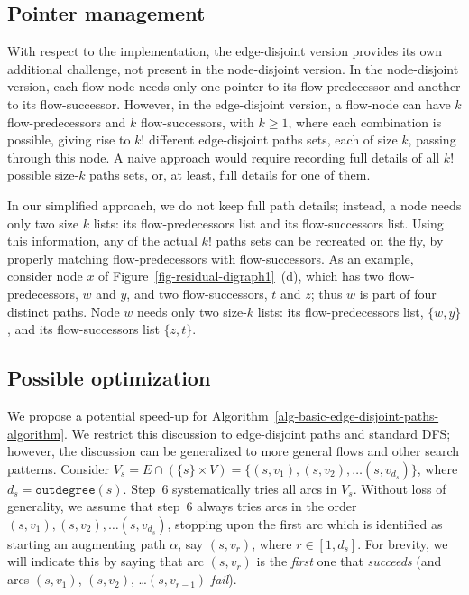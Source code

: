 \documentclass[preliminary,copyright,creativecommons]{eptcs}
\theoremstyle{remark}
\begin{document}
\subsection{Pointer management}
\label{sec-pointer-management}

With respect to the implementation, the edge-disjoint version provides 
its own additional challenge, not present in the node-disjoint version. 
In the node-disjoint version,
each flow-node needs only one pointer to its flow-predecessor and another 
to its flow-successor. However, in the edge-disjoint version,
a flow-node can have $k$ flow-predecessors and $k$ flow-successors, with $k \geq 1$,
where each combination is possible, giving rise to $k!$ 
different edge-disjoint paths sets, each of size $k$, passing through this node.
A naive approach would require recording full details of all $k!$ possible 
size-$k$ paths sets,
or, at least, full details for one of them.

In our simplified approach, we do not keep full path details;
instead, a node needs only two size $k$ lists:
its flow-predecessors list and its flow-successors list.
Using this information, any of the actual $k!$ paths sets can be recreated on the fly,
by properly matching flow-predecessors with flow-successors.
As an example, consider node $x$ of Figure~\ref{fig-residual-digraph1}~(d),
which has two flow-predecessors, $w$ and $y$, and two flow-successors, $t$ and $z$;
thus $w$ is part of four distinct paths.
Node $w$ needs only two size-$k$ lists:
its flow-predecessors list, $\{ w, y \}$, and its flow-successors list $\{ z, t \}$.


\subsection{Possible optimization}
\label{sec-possible-optimization}

We propose a potential speed-up for Algorithm~\ref{alg-basic-edge-disjoint-paths-algorithm}.
We restrict this discussion to edge-disjoint paths and standard DFS;
however, the discussion can be generalized to more general flows and other search patterns.
Consider $V_s = E \cap (\{s\} \times V) = \{(s,v_1), (s,v_2), \dots (s,v_{d_s}) \}$, where $d_s = \mathtt{outdegree}(s)$. 
Step~6 systematically tries all arcs in $V_s$.
Without loss of generality, we assume that step~6 
always tries arcs in the order $(s,v_1), (s,v_2), \dots (s,v_{d_s})$,
stopping upon the first arc which is identified as starting an augmenting path $\alpha$,
say $(s,v_r)$, where $r \in [1,d_s]$.
For brevity, we will indicate this by saying that 
arc $(s,v_r)$ is the \emph{first} one that \emph{succeeds}
(and arcs $(s,v_1)$, $(s,v_2)$, \dots $(s,v_{r-1})$ \emph{fail}).
\end{document}
